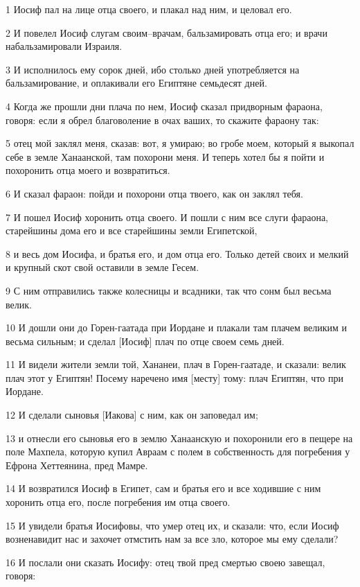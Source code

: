 \par 1 Иосиф пал на лице отца своего, и плакал над ним, и целовал его.
\par 2 И повелел Иосиф слугам своим--врачам, бальзамировать отца его; и врачи набальзамировали Израиля.
\par 3 И исполнилось ему сорок дней, ибо столько дней употребляется на бальзамирование, и оплакивали его Египтяне семьдесят дней.
\par 4 Когда же прошли дни плача по нем, Иосиф сказал придворным фараона, говоря: если я обрел благоволение в очах ваших, то скажите фараону так:
\par 5 отец мой заклял меня, сказав: вот, я умираю; во гробе моем, который я выкопал себе в земле Ханаанской, там похорони меня. И теперь хотел бы я пойти и похоронить отца моего и возвратиться.
\par 6 И сказал фараон: пойди и похорони отца твоего, как он заклял тебя.
\par 7 И пошел Иосиф хоронить отца своего. И пошли с ним все слуги фараона, старейшины дома его и все старейшины земли Египетской,
\par 8 и весь дом Иосифа, и братья его, и дом отца его. Только детей своих и мелкий и крупный скот свой оставили в земле Гесем.
\par 9 С ним отправились также колесницы и всадники, так что сонм был весьма велик.
\par 10 И дошли они до Горен-гаатада при Иордане и плакали там плачем великим и весьма сильным; и сделал [Иосиф] плач по отце своем семь дней.
\par 11 И видели жители земли той, Хананеи, плач в Горен-гаатаде, и сказали: велик плач этот у Египтян! Посему наречено имя [месту] тому: плач Египтян, что при Иордане.
\par 12 И сделали сыновья [Иакова] с ним, как он заповедал им;
\par 13 и отнесли его сыновья его в землю Ханаанскую и похоронили его в пещере на поле Махпела, которую купил Авраам с полем в собственность для погребения у Ефрона Хеттеянина, пред Мамре.
\par 14 И возвратился Иосиф в Египет, сам и братья его и все ходившие с ним хоронить отца его, после погребения им отца своего.
\par 15 И увидели братья Иосифовы, что умер отец их, и сказали: что, если Иосиф возненавидит нас и захочет отмстить нам за все зло, которое мы ему сделали?
\par 16 И послали они сказать Иосифу: отец твой пред смертью своею завещал, говоря:
